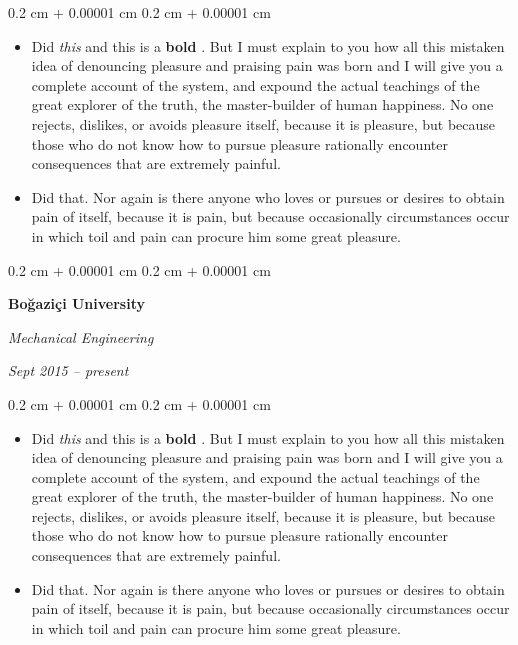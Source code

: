\documentclass[10pt, letterpaper]{article}
\newenvironment{highlights}{
    \begin{itemize}[
        topsep=0.10 cm,
        parsep=0.10 cm,
        partopsep=0pt,
        itemsep=0pt,
        leftmargin=0.4 cm + 10pt
    ]
}{
    \end{itemize}
} %
\newenvironment{onecolentry}{
    \begin{adjustwidth}{
        0.2 cm + 0.00001 cm
    }{
        0.2 cm + 0.00001 cm
    }
}{
    \end{adjustwidth}
} %
\newenvironment{twocolentry}[2][]{
    \onecolentry
    \def\secondColumn{#2}
    \setcolumnwidth{\fill, 4.5 cm}
    \begin{paracol}{2}
}{
    \switchcolumn \raggedleft \secondColumn
    \end{paracol}
    \endonecolentry
} %
\let\hrefWithoutArrow\href
\renewcommand{\href}[2]{\hrefWithoutArrow{#1}{\ifthenelse{\equal{#2}{}}{ }{#2 }\raisebox{.15ex}{\footnotesize \faExternalLink*}}}
\begin{document}
        \vspace{0.10 cm}
        \begin{onecolentry}
            \begin{highlights}
                \item Did \textit{this} and this is a \textbf{bold} \href{https://example.com}{link}. But I must explain to you how all this mistaken idea of denouncing pleasure and praising pain was born and I will give you a complete account of the system, and expound the actual teachings of the great explorer of the truth, the master-builder of human happiness. No one rejects, dislikes, or avoids pleasure itself, because it is pleasure, but because those who do not know how to pursue pleasure rationally encounter consequences that are extremely painful.
                \item Did that. Nor again is there anyone who loves or pursues or desires to obtain pain of itself, because it is pain, but because occasionally circumstances occur in which toil and pain can procure him some great pleasure.
            \end{highlights}
        \end{onecolentry}


        \vspace{0.2 cm}

        \begin{twocolentry}{
            
            
        \textit{Sept 2015 – present}}
            \textbf{Boğaziçi University}

            \textit{Mechanical Engineering}
        \end{twocolentry}

        \vspace{0.10 cm}
        \begin{onecolentry}
            \begin{highlights}
                \item Did \textit{this} and this is a \textbf{bold} \href{https://example.com}{link}. But I must explain to you how all this mistaken idea of denouncing pleasure and praising pain was born and I will give you a complete account of the system, and expound the actual teachings of the great explorer of the truth, the master-builder of human happiness. No one rejects, dislikes, or avoids pleasure itself, because it is pleasure, but because those who do not know how to pursue pleasure rationally encounter consequences that are extremely painful.
                \item Did that. Nor again is there anyone who loves or pursues or desires to obtain pain of itself, because it is pain, but because occasionally circumstances occur in which toil and pain can procure him some great pleasure.
            \end{highlights}
        \end{onecolentry}
\end{document}
